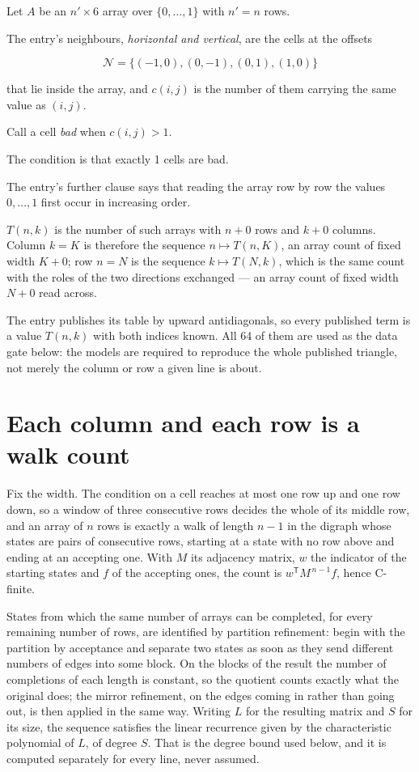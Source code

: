 \documentclass[11pt]{article}
\theoremstyle{definition}
\begin{document}
Let $A$ be an $n' \times 6$ array over $\{0,\dots,1\}$ with $n' = n$ rows.

The entry's neighbours, {\itshape horizontal and vertical}, are the cells at the offsets

\[\mathcal{N} = \{(-1,0), (0,-1), (0,1), (1,0)\}\]

that lie inside the array, and $c(i,j)$ is the number of them carrying the same value as $(i,j)$.

Call a cell {\itshape bad} when $c(i,j) > 1$.

The condition is that exactly 1 cells are bad.

The entry's further clause says that reading the array row by row the values $0,\dots,1$ first occur in increasing order.

$T(n,k)$ is the number of such arrays with $n + 0$ rows and $k + 0$ columns. Column $k = K$ is therefore the sequence $n \mapsto T(n,K)$, an array count of fixed width $K + 0$; row $n = N$ is the sequence $k \mapsto T(N,k)$, which is the same count with the roles of the two directions exchanged --- an array count of fixed width $N + 0$ read across.

The entry publishes its table by upward antidiagonals, so every published term is a value $T(n,k)$ with both indices known. All 64 of them are used as the data gate below: the models are required to reproduce the whole published triangle, not merely the column or row a given line is about.

\section{Each column and each row is a walk count}

Fix the width. The condition on a cell reaches at most one row up and one row down, so a window of three consecutive rows decides the whole of its middle row, and an array of $n$ rows is exactly a walk of length $n-1$ in the digraph whose states are pairs of consecutive rows, starting at a state with no row above and ending at an accepting one. With $M$ its adjacency matrix, $w$ the indicator of the starting states and $f$ of the accepting ones, the count is $w^{\mathsf T}M^{\,n-1}f$, hence C-finite.

States from which the same number of arrays can be completed, for every remaining number of rows, are identified by partition refinement: begin with the partition by acceptance and separate two states as soon as they send different numbers of edges into some block. On the blocks of the result the number of completions of each length is constant, so the quotient counts exactly what the original does; the mirror refinement, on the edges coming in rather than going out, is then applied in the same way. Writing $L$ for the resulting matrix and $S$ for its size, the sequence satisfies the linear recurrence given by the characteristic polynomial of $L$, of degree $S$. That is the degree bound used below, and it is computed separately for every line, never assumed.
\end{document}
